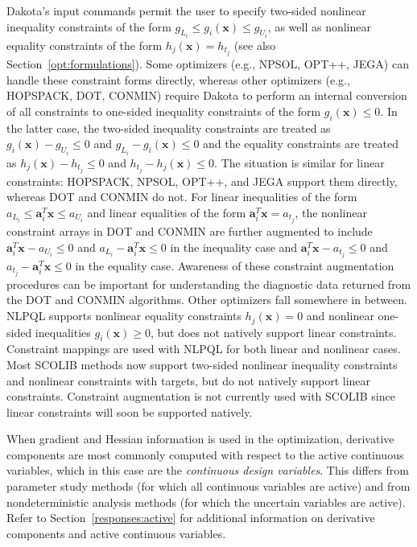 Dakota's input commands permit the user to specify two-sided nonlinear
inequality constraints of the form $g_{L_{i}} \leq g_{i}(\mathbf{x})
\leq g_{U_{i}}$, as well as nonlinear equality constraints of the form
$h_{j}(\mathbf{x}) = h_{t_{j}}$ (see also
Section~\ref{opt:formulations}). Some optimizers
(e.g., NPSOL, OPT++, JEGA) can handle these constraint forms directly,
whereas other optimizers (e.g., HOPSPACK, DOT, CONMIN) require Dakota
to perform an internal conversion of all constraints to one-sided
inequality constraints of the form $g_{i}(\mathbf{x}) \leq 0$. In the
latter case, the two-sided inequality constraints are treated as
$g_{i}(\mathbf{x}) - g_{U_{i}} \leq 0$ and $g_{L_{i}} -
g_{i}(\mathbf{x}) \leq 0$ and the equality constraints are treated as
$h_{j}(\mathbf{x}) - h_{t_{j}} \leq 0$ and $h_{t_{j}} -
h_{j}(\mathbf{x}) \leq 0$. The situation is similar for linear
constraints: HOPSPACK, NPSOL, OPT++, and JEGA support them directly,
whereas DOT and CONMIN do not.  For linear inequalities of the form
$a_{L_{i}} \leq \mathbf{a}_{i}^{T}\mathbf{x} \leq a_{U_{i}}$ and
linear equalities of the form $\mathbf{a}_{i}^{T}\mathbf{x} =
a_{t_{j}}$, the nonlinear constraint arrays in DOT and CONMIN are
further augmented to include $\mathbf{a}_{i}^{T}\mathbf{x} - a_{U_{i}}
\leq 0$ and $a_{L_{i}} - \mathbf{a}_{i}^{T}\mathbf{x} \leq 0$ in the
inequality case and $\mathbf{a}_{i}^{T}\mathbf{x} - a_{t_{j}} \leq 0$
and $a_{t_{j}} - \mathbf{a}_{i}^{T}\mathbf{x} \leq 0$ in the equality
case. Awareness of these constraint augmentation procedures can be
important for understanding the diagnostic data returned from the DOT
and CONMIN algorithms.  Other optimizers fall somewhere in between.
NLPQL supports nonlinear equality constraints $h_{j}(\mathbf{x}) = 0$
and nonlinear one-sided inequalities $g_{i}(\mathbf{x}) \geq 0$, but
does not natively support linear constraints.  Constraint mappings are
used with NLPQL for both linear and nonlinear cases.  Most SCOLIB
methods now support two-sided nonlinear inequality constraints and
nonlinear constraints with targets, but do not natively support linear
constraints.  Constraint augmentation is not currently used with
SCOLIB since linear constraints will soon be supported natively.

When gradient and Hessian information is used in the optimization,
derivative components are most commonly computed with respect to the
active continuous variables, which in this case are the
\emph{continuous design variables}. This differs from parameter study
methods (for which all continuous variables are active) and from
nondeterministic analysis methods (for which the uncertain variables
are active).  Refer to Section~\ref{responses:active} for additional
information on derivative components and active continuous variables.


